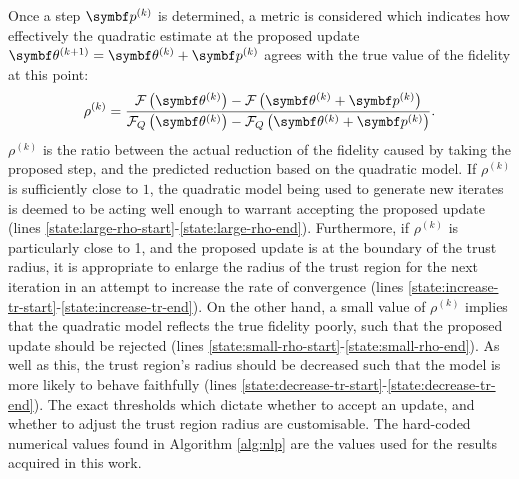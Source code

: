Once a step $\bpk$ is determined, a metric is considered which indicates how
effectively the quadratic estimate at the proposed update $\bthkplusone = \bthk
+ \bpk$ agrees with the true value of the fidelity at this point:
\begin{equation}
    \rho^{(k)} = \frac
        {\Fthk - \Fthkpk}
        {\FQthk - \FQthkpk}.
\end{equation}
$\rho^{(k)}$ is the ratio between the actual reduction of the fidelity caused
by taking the proposed step, and the predicted reduction based on the quadratic
model. If $\rho^{(k)}$ is sufficiently close to $1$, the quadratic model being
used to generate new iterates is deemed to be acting well enough to warrant
accepting the proposed update
(lines \ref{state:large-rho-start}-\ref{state:large-rho-end}).
Furthermore, if $\rho^{(k)}$ is particularly close to 1, and the proposed
update is at the boundary of the trust radius, it is appropriate to enlarge the
radius of the trust region for the next iteration in an attempt to increase the
rate of convergence
(lines \ref{state:increase-tr-start}-\ref{state:increase-tr-end}).
On the other hand, a small value of $\rho^{(k)}$ implies that the
quadratic model reflects the true fidelity poorly, such that the proposed
update should be rejected
(lines \ref{state:small-rho-start}-\ref{state:small-rho-end}).
As well as this, the trust region's radius should be
decreased such that the model is more likely to behave faithfully
(lines \ref{state:decrease-tr-start}-\ref{state:decrease-tr-end}). The exact
thresholds which dictate whether to accept an update, and whether to adjust the
trust region radius are customisable. The hard-coded numerical values found in
Algorithm \ref{alg:nlp} are the values used for the results acquired in this work.

